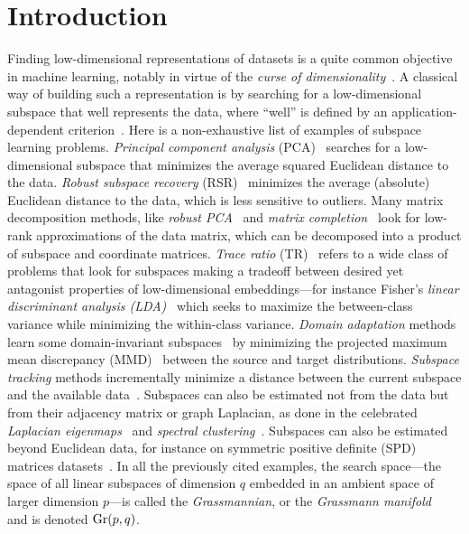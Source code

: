 \section{Introduction}\label{sec:intro}

Finding low-dimensional representations of datasets is a quite common objective in machine learning, notably in virtue of the \textit{curse of dimensionality}~\citep{bellman_dynamic_1984}.
A classical way of building such a representation is by searching for a low-dimensional subspace that well represents the data, where ``well'' is defined by an application-dependent criterion~\citep{cunningham_linear_2015}. Here is a non-exhaustive list of examples of subspace learning problems.
\textit{Principal component analysis} (PCA)~\citep{jolliffe_principal_2002} searches for a low-dimensional subspace that minimizes the average squared Euclidean distance to the data.
\textit{Robust subspace recovery} (RSR)~\citep{lerman_overview_2018} minimizes the average (absolute) Euclidean distance to the data, which is less sensitive to outliers.
Many matrix decomposition methods, like \textit{robust PCA}~\citep{candes_robust_2011} and \textit{matrix completion}~\citep{keshavan_matrix_2010,candes_exact_2012} look for low-rank approximations of the data matrix, which can be decomposed into a product of subspace and coordinate matrices.
\textit{Trace ratio} (TR)~\citep{ngo_trace_2012} refers to a wide class of problems that look for subspaces making a tradeoff between desired yet antagonist properties of low-dimensional embeddings---for instance Fisher's \textit{linear discriminant analysis (LDA)}~\citep{fisher_use_1936} which seeks to maximize the between-class variance while minimizing the within-class variance.
\textit{Domain adaptation} methods learn some domain-invariant subspaces~\citep{baktashmotlagh_unsupervised_2013} by minimizing the projected maximum mean discrepancy (MMD)~\citep{gretton_kernel_2012} between the source and target distributions.
\textit{Subspace tracking} methods incrementally minimize a distance between the current subspace and the available data~\citep{balzano_online_2010}.
Subspaces can also be estimated not from the data but from their adjacency matrix or graph Laplacian, as done in the celebrated \textit{Laplacian eigenmaps}~\citep{belkin_laplacian_2003} and \textit{spectral clustering}~\citep{ng_spectral_2001}.
Subspaces can also be estimated beyond Euclidean data, for instance on symmetric positive definite (SPD) matrices datasets~\citep{harandi_dimensionality_2018}.
In all the previously cited examples, the search space---the space of all linear subspaces of dimension $q$ embedded in an ambient space of larger dimension $p$---is called the \textit{Grassmannian}, or the \textit{Grassmann manifold}~\citep{bendokat_grassmann_2024} and is denoted $\operatorname{Gr}(p, q)$. 
